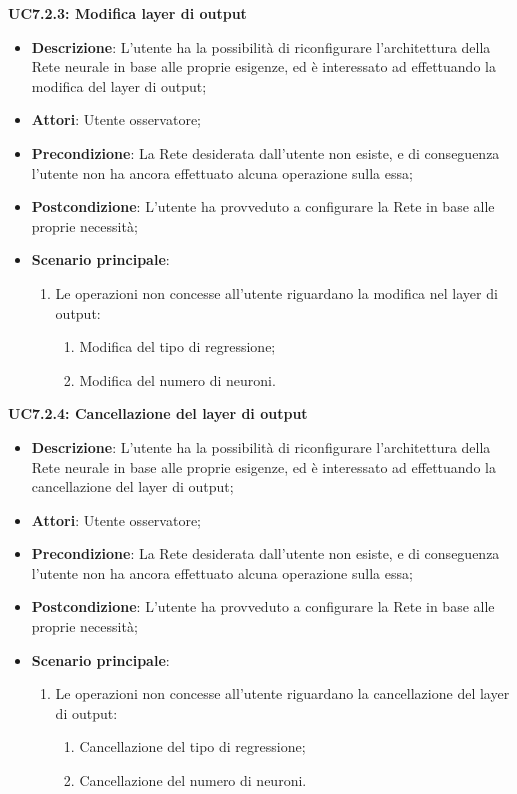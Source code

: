 \textbf{UC7.2.3: Modifica layer di output}
\label{UC7.2.3: Modifica layer di output}
\noindent
\begin{itemize}
\item \textbf{Descrizione}: L'utente ha la possibilit\`a di riconfigurare l'architettura della Rete neurale in base alle proprie esigenze, ed \`e interessato ad effettuando la modifica del layer di output;
\item \textbf{Attori}: Utente osservatore;
\item \textbf{Precondizione}: La Rete desiderata dall'utente non esiste, e di conseguenza l'utente non ha ancora effettuato alcuna operazione sulla essa;
\item \textbf{Postcondizione}: L'utente ha provveduto a configurare la Rete in base alle proprie necessit\`a;
\item \textbf{Scenario principale}:
\begin{enumerate}
\item Le operazioni non concesse all'utente riguardano la modifica nel layer di output:
\begin{enumerate}
\item Modifica del tipo di regressione;
\item Modifica del numero di neuroni.
\end{enumerate}
\end{enumerate}
\end{itemize}

\textbf{UC7.2.4: Cancellazione del layer di output}
\label{UC7.2.4: Cancellazione del layer di output}
\noindent
\begin{itemize}
\item \textbf{Descrizione}: L'utente ha la possibilit\`a di riconfigurare l'architettura della Rete neurale in base alle proprie esigenze, ed \`e interessato ad effettuando la cancellazione del layer di output;
\item \textbf{Attori}: Utente osservatore;
\item \textbf{Precondizione}: La Rete desiderata dall'utente non esiste, e di conseguenza l'utente non ha ancora effettuato alcuna operazione sulla essa;
\item \textbf{Postcondizione}: L'utente ha provveduto a configurare la Rete in base alle proprie necessit\`a;
\item \textbf{Scenario principale}:
\begin{enumerate}
\item Le operazioni non concesse all'utente riguardano la cancellazione del layer di output:
\begin{enumerate}
\item Cancellazione del tipo di regressione;
\item Cancellazione del numero di neuroni.
\end{enumerate}
\end{enumerate}
\end{itemize}

